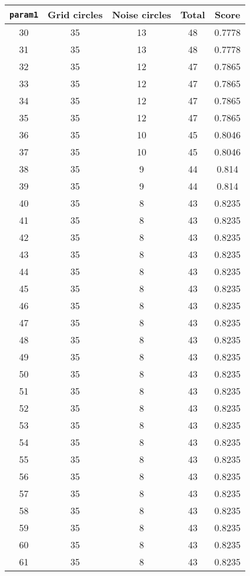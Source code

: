 \documentclass[letterpaper, 12pt]{article}
\begin{document}
\begin{longtable}{|c|c|c|c|c|}
\hline
\textbf{\texttt{param1}} & \textbf{Grid circles} & \textbf{Noise circles} & \textbf{Total} & \textbf{Score} \\
\hline
30 & 35 & 13 & 48 & 0.7778 \\
\hline
31 & 35 & 13 & 48 & 0.7778 \\
\hline
32 & 35 & 12 & 47 & 0.7865 \\
\hline
33 & 35 & 12 & 47 & 0.7865 \\
\hline
34 & 35 & 12 & 47 & 0.7865 \\
\hline
35 & 35 & 12 & 47 & 0.7865 \\
\hline
36 & 35 & 10 & 45 & 0.8046 \\
\hline
37 & 35 & 10 & 45 & 0.8046 \\
\hline
38 & 35 & 9 & 44 & 0.814 \\
\hline
39 & 35 & 9 & 44 & 0.814 \\
\hline
40 & 35 & 8 & 43 & 0.8235 \\
\hline
41 & 35 & 8 & 43 & 0.8235 \\
\hline
42 & 35 & 8 & 43 & 0.8235 \\
\hline
43 & 35 & 8 & 43 & 0.8235 \\
\hline
44 & 35 & 8 & 43 & 0.8235 \\
\hline
45 & 35 & 8 & 43 & 0.8235 \\
\hline
46 & 35 & 8 & 43 & 0.8235 \\
\hline
47 & 35 & 8 & 43 & 0.8235 \\
\hline
48 & 35 & 8 & 43 & 0.8235 \\
\hline
49 & 35 & 8 & 43 & 0.8235 \\
\hline
50 & 35 & 8 & 43 & 0.8235 \\
\hline
51 & 35 & 8 & 43 & 0.8235 \\
\hline
52 & 35 & 8 & 43 & 0.8235 \\
\hline
53 & 35 & 8 & 43 & 0.8235 \\
\hline
54 & 35 & 8 & 43 & 0.8235 \\
\hline
55 & 35 & 8 & 43 & 0.8235 \\
\hline
56 & 35 & 8 & 43 & 0.8235 \\
\hline
57 & 35 & 8 & 43 & 0.8235 \\
\hline
58 & 35 & 8 & 43 & 0.8235 \\
\hline
59 & 35 & 8 & 43 & 0.8235 \\
\hline
60 & 35 & 8 & 43 & 0.8235 \\
\hline
61 & 35 & 8 & 43 & 0.8235 \\

\end{longtable}
\end{document}
